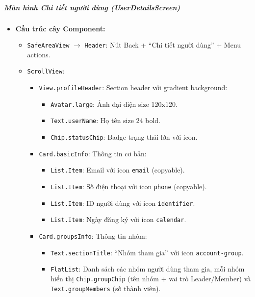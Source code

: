 \subparagraph{Màn hình Chi tiết người dùng (UserDetailsScreen)}
\begin{itemize}
    \item \textbf{Cấu trúc cây Component:}
        \begin{itemize}
            \item \texttt{SafeAreaView} $\rightarrow$ \texttt{Header}: Nút Back + ``Chi tiết người dùng'' + Menu actions.
            \item \texttt{ScrollView}:
                \begin{itemize}
                    \item \texttt{View.profileHeader}: Section header với gradient background:
                        \begin{itemize}
                            \item \texttt{Avatar.large}: Ảnh đại diện size 120x120.
                            \item \texttt{Text.userName}: Họ tên size 24 bold.
                            \item \texttt{Chip.statusChip}: Badge trạng thái lớn với icon.
                        \end{itemize}
                    \item \texttt{Card.basicInfo}: Thông tin cơ bản:
                        \begin{itemize}
                            \item \texttt{List.Item}: Email với icon \texttt{email} (copyable).
                            \item \texttt{List.Item}: Số điện thoại với icon \texttt{phone} (copyable).
                            \item \texttt{List.Item}: ID người dùng với icon \texttt{identifier}.
                            \item \texttt{List.Item}: Ngày đăng ký với icon \texttt{calendar}.
                        \end{itemize}
                    \item \texttt{Card.groupsInfo}: Thông tin nhóm:
                        \begin{itemize}
                            \item \texttt{Text.sectionTitle}: ``Nhóm tham gia'' với icon \texttt{account-group}.
                            \item \texttt{FlatList}: Danh sách các nhóm người dùng tham gia, mỗi nhóm hiển thị \texttt{Chip.groupChip} (tên nhóm + vai trò Leader/Member) và \texttt{Text.groupMembers} (số thành viên).

\end{itemize}
\end{itemize}
\end{itemize}
\end{itemize}
